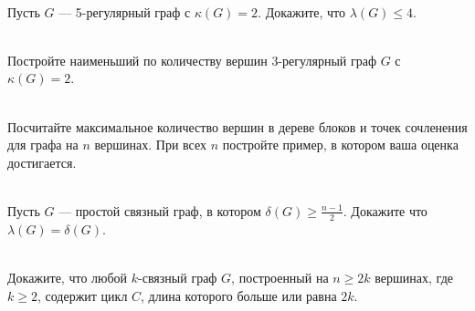 \documentclass[a4paper,12pt,twoside]{article}
\begin{document}
\begin{?}\ \\
     Пусть \(G\) --- 5-регулярный граф с \(\kappa(G) = 2\). Докажите, что \(\lambda(G) \leqslant 4\).
\end{?}
\begin{?}\ \\
     Постройте наименьший по количеству вершин 3-регулярный граф \(G\) с \(\kappa(G) = 2\).
\end{?}
\begin{?}\ \\
     Посчитайте максимальное количество вершин в дереве блоков и точек сочленения для графа на \(n\) вершинах. При всех \(n\) постройте пример, в котором ваша оценка достигается.
\end{?}
\begin{?}\ \\
     Пусть \(G\) --- простой связный граф, в котором \(\delta(G) \geqslant \frac{n-1}{2}\). Докажите что \(\lambda(G) = \delta(G)\).
\end{?}
\begin{?}\ \\
     Докажите, что любой \(k\)-связный граф \(G\), построенный на \(n \geqslant 2k\) вершинах, где \(k \geqslant 2\), содержит цикл \(C\), длина которого больше или равна \(2k\).
\end{?}
\end{document}
